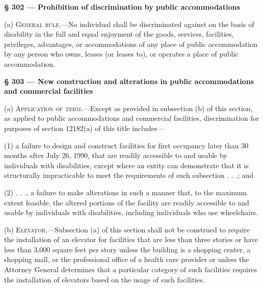 
\textbf{{\S} 302 --- Prohibition of discrimination by public accommodations}

(a) \textsc{General rule}.---No individual shall be discriminated against on the
basis of disability in the
full and equal enjoyment of the goods, services, facilities, privileges,
advantages, or accommodations of any place of public accommodation by any
person who owns, leases (or leases to), or operates a place of public
accommodation.

\textbf{{\S} 303 --- New construction and alterations in public accommodations
and commercial facilities}

(a) \textsc{Application of term}.---Except as provided in subsection (b) of this
section, as applied to public
accommodations and commercial facilities, discrimination for purposes of
section 12182(a) of this title includes---
\begin{statute}
\item (1) a failure to design and construct facilities for first occupancy later
than
30 months after July 26, 1990, that are readily accessible to and usable by
individuals with disabilities, except where an entity can demonstrate that it
is structurally impracticable to meet the requirements of such subsection . .
.; and

\item (2) . . ., a failure to make alterations in such a manner that, to the
maximum
extent feasible, the altered portions of the facility are readily accessible to
and usable by individuals with disabilities, including individuals who use
wheelchairs.
\end{statute}

(b) \textsc{Elevator}.---Subsection (a) of this section shall not be construed
to require the
installation of an elevator for facilities that are less than three stories or
have less than 3,000 square feet per story unless the building is a shopping
center, a shopping mall, or the professional office of a health care provider
or unless the Attorney General determines that a particular category of such
facilities requires the installation of elevators based on the usage of such
facilities.



